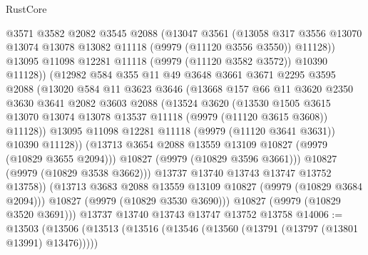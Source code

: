 \begin{lexlean}{RustCore}
\begin{coremodule}
                  @3571
                  @3582
                  @2082
                  @3545
                  @2088
                  (@13047
                    @3561
                    (@13058
                      @317
                      @3556
                      @13070
                      @13074
                      @13078
                      @13082
                      @11118
                      (@9979 (@11120 @3556 @3550))
                      @11128))
                  @13095
                  @11098
                  @12281
                  @11118
                  (@9979 (@11120 @3582 @3572))
                  @10390
                  @11128))
              (@12982
                @584
                @355
                @11
                @49
                @3648
                @3661
                @3671
                @2295
                @3595
                @2088
                (@13020
                  @584
                  @11
                  @3623
                  @3646
                  (@13668
                    @157
                    @66
                    @11
                    @3620
                    @2350
                    @3630
                    @3641
                    @2082
                    @3603
                    @2088
                    (@13524
                      @3620
                      (@13530
                        @1505
                        @3615
                        @13070
                        @13074
                        @13078
                        @13537
                        @11118
                        (@9979 (@11120 @3615 @3608))
                        @11128))
                    @13095
                    @11098
                    @12281
                    @11118
                    (@9979 (@11120 @3641 @3631))
                    @10390
                    @11128))
                (@13713 @3654 @2088 @13559 @13109 @10827 (@9979 (@10829 @3655 @2094)))
                @10827
                (@9979 (@10829 @3596 @3661)))
              @10827
              (@9979 (@10829 @3538 @3662)))
            @13737
            @13740
            @13743
            @13747
            @13752
            @13758))
        (@13713 @3683 @2088 @13559 @13109 @10827 (@9979 (@10829 @3684 @2094)))
        @10827
        (@9979 (@10829 @3530 @3690)))
      @10827
      (@9979 (@10829 @3520 @3691)))
    @13737
    @13740
    @13743
    @13747
    @13752
    @13758
@14006 := @13503
    (@13506
      (@13513
        (@13516 (@13546 (@13560 (@13791 (@13797 (@13801 @13991) @13476)))))

\end{coremodule}
\end{lexlean}
